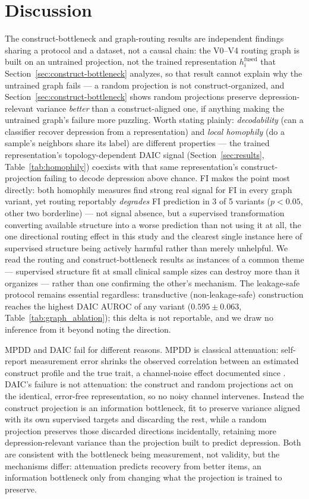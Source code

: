 \documentclass[letterpaper]{article}
\begin{document}
\section{Discussion}
\label{sec:discussion}

The construct-bottleneck and graph-routing results are independent findings sharing a protocol and a dataset, not a causal chain: the V0--V4 routing graph is built on an untrained projection, not the trained representation $h_i^{\text{fused}}$ that Section~\ref{sec:construct-bottleneck} analyzes, so that result cannot explain why the untrained graph fails — a random projection is not construct-organized, and Section~\ref{sec:construct-bottleneck} shows random projections preserve depression-relevant variance \emph{better} than a construct-aligned one, if anything making the untrained graph's failure more puzzling. Worth stating plainly: \emph{decodability} (can a classifier recover depression from a representation) and \emph{local homophily} (do a sample's neighbors share its label) are different properties — the trained representation's topology-dependent DAIC signal (Section~\ref{sec:results}, Table~\ref{tab:homophily}) coexists with that same representation's construct-projection failing to decode depression above chance. FI makes the point most directly: both homophily measures find strong real signal for FI in every graph variant, yet routing reportably \emph{degrades} FI prediction in 3 of 5 variants ($p<0.05$, other two borderline) — not signal absence, but a supervised transformation converting available structure into a worse prediction than not using it at all, the one directional routing effect in this study and the clearest single instance here of supervised structure being actively harmful rather than merely unhelpful. We read the routing and construct-bottleneck results as instances of a common theme — supervised structure fit at small clinical sample sizes can destroy more than it organizes — rather than one confirming the other's mechanism. The leakage-safe protocol remains essential regardless: transductive (non-leakage-safe) construction reaches the highest DAIC AUROC of any variant ($0.595\pm0.063$, Table~\ref{tab:graph_ablation}); this delta is not reportable, and we draw no inference from it beyond noting the direction.

MPDD and DAIC fail for different reasons. MPDD is classical attenuation: self-report measurement error shrinks the observed correlation between an estimated construct profile and the true trait, a channel-noise effect documented since \citet{spearman1904}. DAIC's failure is not attenuation: the construct and random projections act on the identical, error-free representation, so no noisy channel intervenes. Instead the construct projection is an information bottleneck, fit to preserve variance aligned with its own supervised targets and discarding the rest, while a random projection preserves those discarded directions incidentally, retaining more depression-relevant variance than the projection built to predict depression. Both are consistent with the bottleneck being measurement, not validity, but the mechanisms differ: attenuation predicts recovery from better items, an information bottleneck only from changing what the projection is trained to preserve.
\end{document}
